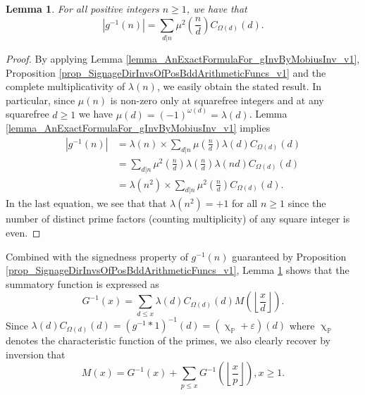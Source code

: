 \documentclass[11pt,reqno,a4letter]{article}
\numberwithin{figure}{section}
\numberwithin{table}{section}
\renewcommand{\chi}{\upchi}
\newcommand{\Floor}[2]{\ensuremath{\left\lfloor \frac{#1}{#2} \right\rfloor}}
\theoremstyle{plain}
\newtheorem{lemma}[theorem]{Lemma}
\numberwithin{theorem}{section}
\theoremstyle{definition}
\begin{document}
\begin{lemma} 
\label{lemma_AbsValueOf_gInvn_FornSquareFree_v1} 
For all positive integers $n \geq 1$, we have that 
\begin{equation} 
\label{eqn_AbsValueOf_gInvn_FornSquareFree_v1} 
|g^{-1}(n)| = \sum_{d|n} \mu^2\left(\frac{n}{d}\right) C_{\Omega(d)}(d). 
\end{equation} 
\end{lemma} 
\begin{proof} 
By applying 
Lemma \ref{lemma_AnExactFormulaFor_gInvByMobiusInv_v1}, 
Proposition \ref{prop_SignageDirInvsOfPosBddArithmeticFuncs_v1} and the 
complete multiplicativity of $\lambda(n)$, 
we easily obtain the stated result. 
In particular, since $\mu(n)$ is non-zero only at squarefree integers and 
at any squarefree $d \geq 1$ we have $\mu(d) = (-1)^{\omega(d)} = \lambda(d)$. 
Lemma \ref{lemma_AnExactFormulaFor_gInvByMobiusInv_v1} implies 
\begin{align*} 
|g^{-1}(n)| & = \lambda(n) \times \sum_{d|n} \mu\left(\frac{n}{d}\right) \lambda(d) C_{\Omega(d)}(d) \\ 
     & = \sum_{d|n} \mu^2\left(\frac{n}{d}\right) \lambda\left(\frac{n}{d}\right) 
     \lambda(nd) C_{\Omega(d)}(d) \\ 
     & = \lambda(n^2) \times \sum_{d|n} \mu^2\left(\frac{n}{d}\right) C_{\Omega(d)}(d). 
\end{align*} 
In the last equation, we see that 
that $\lambda(n^2) = +1$ for all $n \geq 1$ since the number of distinct 
prime factors (counting multiplicity) of any square integer is even. 
\end{proof} 

Combined with the signedness property of $g^{-1}(n)$ guaranteed by 
Proposition \ref{prop_SignageDirInvsOfPosBddArithmeticFuncs_v1}, 
Lemma \ref{lemma_AbsValueOf_gInvn_FornSquareFree_v1} shows that the summatory 
function is expressed as 
\[
G^{-1}(x) = \sum_{d \leq x} \lambda(d) C_{\Omega(d)}(d) M\left(\Floor{x}{d}\right). 
\]
Since $\lambda(d) C_{\Omega(d)}(d) = (g^{-1} \ast 1)^{-1}(d) = (\chi_{\mathbb{P}} + \varepsilon)(d)$ 
where $\chi_{\mathbb{P}}$ denotes the characteristic function of the primes, we also clearly 
recover by inversion that 
\[
M(x) = G^{-1}(x) + \sum_{p \leq x} G^{-1}\left(\Floor{x}{p}\right), x \geq 1. 
\]
\end{document}
